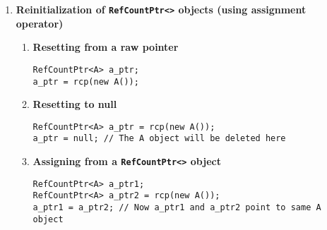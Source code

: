 \documentclass[pdf,ps2pdf,11pt]{SANDreport}
\begin{document}
\begin{enumerate}
\item {\bf Reinitialization of \texttt{RefCountPtr<>} objects (using assignment operator)}
%
\begin{enumerate}
%
\item {\bf Resetting from a raw pointer}
%
{\small\begin{verbatim}
RefCountPtr<A> a_ptr;
a_ptr = rcp(new A());
\end{verbatim}}
%
\item {\bf Resetting to null}
%
{\small\begin{verbatim}
RefCountPtr<A> a_ptr = rcp(new A());
a_ptr = null; // The A object will be deleted here
\end{verbatim}}
%
\item {\bf Assigning from a \texttt{RefCountPtr<>} object}
%
{\small\begin{verbatim}
RefCountPtr<A> a_ptr1;
RefCountPtr<A> a_ptr2 = rcp(new A());
a_ptr1 = a_ptr2; // Now a_ptr1 and a_ptr2 point to same A object
\end{verbatim}}
%
\end{enumerate}


\end{enumerate}
\end{document}
